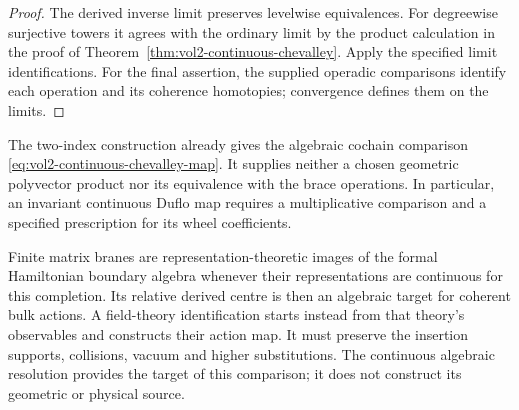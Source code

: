 \begin{proof}
The derived inverse limit preserves levelwise equivalences. For
degreewise surjective towers it agrees with the ordinary limit by
the product calculation in the proof of
Theorem~\ref{thm:vol2-continuous-chevalley}. Apply the specified
limit identifications. For the final assertion, the supplied
operadic comparisons identify each operation and its coherence
homotopies; convergence defines them on the limits.
\end{proof}

The two-index construction already gives the algebraic cochain
comparison \eqref{eq:vol2-continuous-chevalley-map}. It supplies
neither a chosen geometric polyvector product nor its equivalence
with the brace operations. In particular, an invariant continuous
Duflo map requires a multiplicative comparison and a specified
prescription for its wheel coefficients.

Finite matrix branes are representation-theoretic images of the
formal Hamiltonian boundary algebra whenever their representations
are continuous for this completion. Its relative derived centre is
then an algebraic target for coherent bulk actions. A field-theory
identification starts instead from that theory's observables and
constructs their action map. It must preserve the insertion supports,
collisions, vacuum and higher substitutions. The continuous algebraic
resolution provides the target of this comparison; it does not
construct its geometric or physical source.
